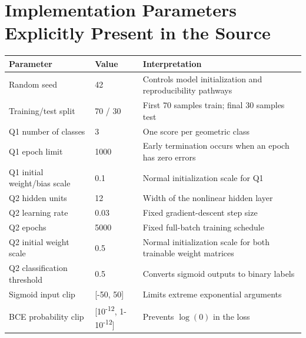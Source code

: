 \documentclass[11pt,a4paper]{article}
\begin{document}
\section{Implementation Parameters Explicitly Present in the Source}
\begin{table}[ht]
\centering
\small
\begin{tabularx}{\textwidth}{>{\raggedright\arraybackslash}p{}p{}X}
\toprule
\textbf{Parameter} & \textbf{Value} & \textbf{Interpretation}\\
\midrule
Random seed & 42 & Controls model initialization and reproducibility pathways\\
Training/test split & 70 / 30 & First 70 samples train; final 30 samples test\\
Q1 number of classes & 3 & One score per geometric class\\
Q1 epoch limit & 1000 & Early termination occurs when an epoch has zero errors\\
Q1 initial weight/bias scale & 0.1 & Normal initialization scale for Q1\\
Q2 hidden units & 12 & Width of the nonlinear hidden layer\\
Q2 learning rate & 0.03 & Fixed gradient-descent step size\\
Q2 epochs & 5000 & Fixed full-batch training schedule\\
Q2 initial weight scale & 0.5 & Normal initialization scale for both trainable weight matrices\\
Q2 classification threshold & 0.5 & Converts sigmoid outputs to binary labels\\
Sigmoid input clip & [-50, 50] & Limits extreme exponential arguments\\
BCE probability clip & [10\textsuperscript{-12}, 1-10\textsuperscript{-12}] & Prevents \(\log(0)\) in the loss\\
\bottomrule
\end{tabularx}
\end{table}
\end{document}
